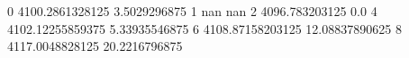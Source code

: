 0 4100.2861328125 3.5029296875
1 nan nan
2 4096.783203125 0.0
4 4102.12255859375 5.33935546875
6 4108.87158203125 12.08837890625
8 4117.0048828125 20.2216796875
